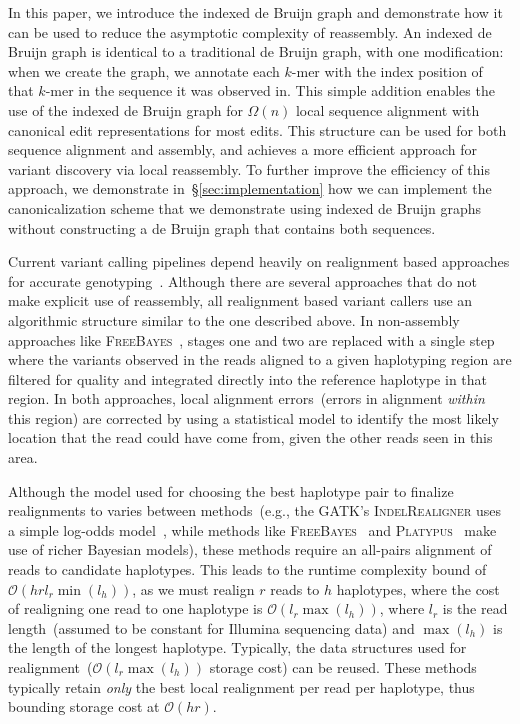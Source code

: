 \documentclass[phd]{ucbthesis}
\begin{document}
In this paper, we introduce the indexed de Bruijn graph and demonstrate how it can be used to
reduce the asymptotic complexity of reassembly. An indexed de Bruijn graph is identical to a
traditional de Bruijn graph, with one modification: when we create the graph, we annotate each
$k$-mer with the index position of that $k$-mer in the sequence it was observed in. This simple addition
enables the use of the indexed de Bruijn graph for $\Omega(n)$ local sequence alignment with
canonical edit representations for most edits. This structure can be used for both sequence alignment and
assembly, and achieves a more efficient approach for variant discovery via local reassembly.
To further improve the efficiency of this approach, we demonstrate in~\S\ref{sec:implementation}
how we can implement the canonicalization scheme that we demonstrate using indexed de Bruijn
graphs without constructing a de Bruijn graph that contains both sequences.

Current variant calling pipelines depend heavily on realignment based approaches for accurate
genotyping~\cite{li14}. Although there are several approaches that do not make explicit use of reassembly,
all realignment based variant callers use an algorithmic structure similar to the one described
above. In non-assembly approaches like \textsc{FreeBayes}~\cite{garrison12}, stages
one and two are replaced with a single step where the variants observed in the reads aligned to a given
haplotyping region are filtered for quality and integrated directly into the reference haplotype in that region.
In both approaches, local alignment errors~(errors in alignment \emph{within} this region) are corrected
by using a statistical model to identify the most likely location that the read could have come from, given
the other reads seen in this area.

Although the model used for choosing the best haplotype pair to finalize realignments to varies between
methods~(e.g., the GATK's \textsc{IndelRealigner} uses a simple log-odds model~\cite{depristo11}, while
methods like \textsc{FreeBayes}~\cite{garrison12} and \textsc{Platypus}~\cite{rimmer14} make use of richer
Bayesian models), these methods require an all-pairs alignment of reads to candidate
haplotypes. This leads to the runtime complexity bound of $\mathcal{O}(h r l_r \min(l_h))$,
as we must realign $r$ reads to $h$ haplotypes, where the cost of realigning
one read to one haplotype is $\mathcal{O}(l_r \max(l_h))$, where $l_r$ is the read length~(assumed to be
constant for Illumina sequencing data) and $\max(l_h)$ is the length of the longest haplotype. Typically,
the data structures used for realignment~($\mathcal{O}(l_r \max(l_h))$ storage cost) can be reused.
These methods typically retain \emph{only} the best local realignment per read per haplotype, thus
bounding storage cost at $\mathcal{O}(h r)$.
\end{document}
